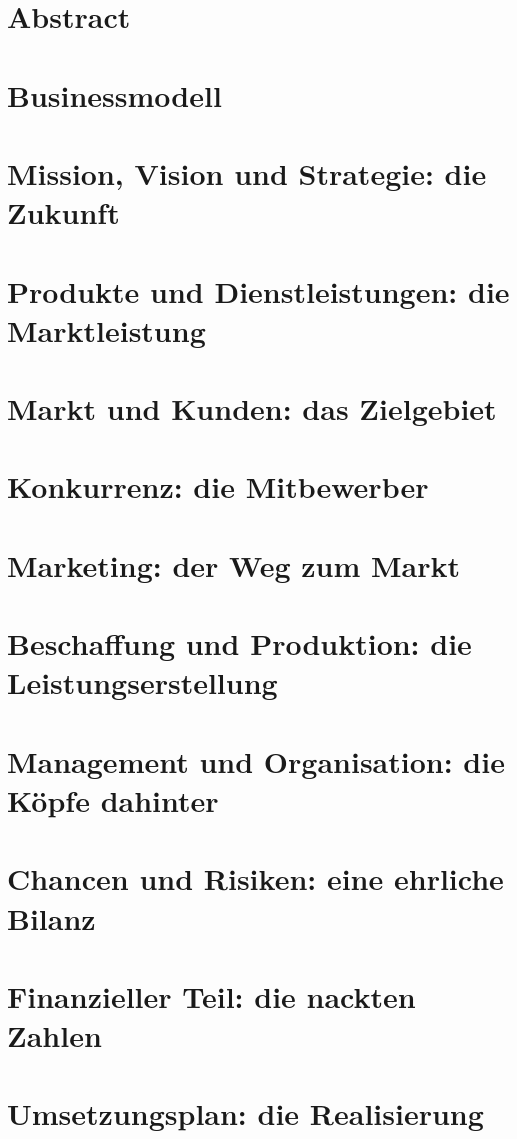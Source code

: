 

\newcommand{\SUBJECT}{Businessplan}
\newcommand{\TITLE}{Digital Fitness Coach}



\section{Abstract}

\section{Businessmodell}

\section{Mission, Vision und Strategie: die Zukunft}

\section{Produkte und Dienstleistungen: die Marktleistung}

\section{Markt und Kunden: das Zielgebiet}

\section{Konkurrenz: die Mitbewerber}

\section{Marketing: der Weg zum Markt}

\section{Beschaffung und Produktion: die Leistungserstellung}

\section{Management und Organisation: die Köpfe dahinter}

\section{Chancen und Risiken: eine ehrliche Bilanz}

\section{Finanzieller Teil: die nackten Zahlen}

\section{Umsetzungsplan: die Realisierung}

